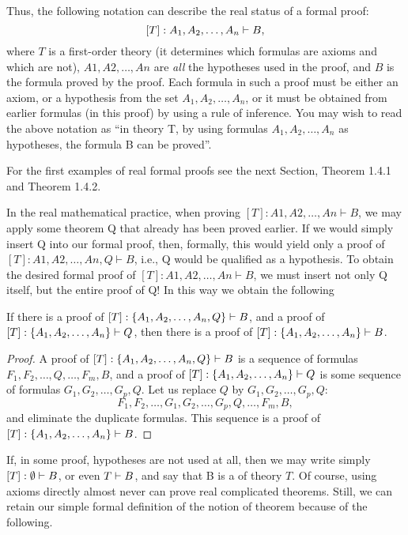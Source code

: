Thus, the following notation can describe the real status of a formal proof:
\[
[T]: A_1, A_2, \ldots , A_n\vdash B,
\]
where \(T\) is a first-order theory (it determines which formulas are axioms and which are not), \(A1, A2, \ldots , An\) are \emph{all} the hypotheses used in the proof, and \(B\) is the formula proved by the proof.
Each formula in such a proof must be either an axiom, or a hypothesis from the set \(A_1, A_2, \ldots , A_n\), or it must be obtained from earlier formulas (in this proof) by using a rule of inference.
You may wish to read the above notation as ``in theory T, by using formulas \(A_1, A_2, \ldots , A_n\) as hypotheses, the formula B can be proved''.

For the first examples of real formal proofs see the next Section, Theorem 1.4.1 and Theorem 1.4.2.

In the real mathematical practice, when proving \([T]: A1, A2, \ldots , An \vdash B\), we may apply some theorem Q that already has been proved earlier. If we would simply insert Q into our formal proof, then, formally,
this would yield only a proof of \([T]: A1, A2, \ldots , An, Q \vdash B\), i.e., Q would be qualified as a hypothesis. To
obtain the desired formal proof of \([T]: A1, A2, \ldots , An \vdash B\), we must insert not only Q itself, but the entire
proof of Q! In this way we obtain the following

\begin{thm}\label{131}
If there is a proof of \([T]: \{A_1, A_2, \ldots, A_n, Q\}\vdash B\), and a proof of \([T]: \{A_1, A_2, \ldots, A_n\}\vdash Q\), then there is a proof of \([T]: \{A_1, A_2, \ldots, A_n\}\vdash B\).
\end{thm}
\begin{proof}
A proof of \([T]: \{A_1, A_2, \ldots, A_n, Q\}\vdash B\) is a sequence of formulas \(F_1, F_2, \ldots, Q, \ldots, F_m, B\), and a proof of \([T]: \{A_1, A_2, \ldots, A_n\}\vdash Q\) is some sequence of formulas \(G_1, G_2, \ldots , G_p, Q\).
Let us replace \(Q\) by \(G_1, G_2, \ldots, G_p, Q\):
\[
F_1, F_2, \ldots , G_1, G_2, \ldots, G_p, Q, \ldots, F_m, B,
\]
and eliminate the duplicate formulas.
This sequence is a proof of \([T]: \{A_1, A_2, \ldots, A_n\}\vdash B\).
\end{proof}

If, in some proof, hypotheses are not used at all, then we may write simply \([T]: \emptyset\vdash B\), or even \(T\vdash B\), and say that B is a  of theory \(T\).
Of course, using axioms directly almost never can prove real complicated theorems. Still, we can retain our simple formal definition of the notion of theorem because of the following.

